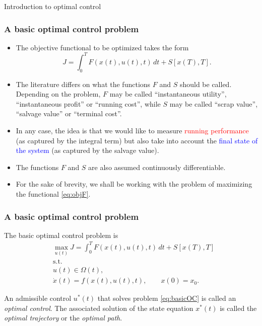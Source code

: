 \documentclass[10pt]{beamer}
\theoremstyle{definition}
\begin{document}
\begin{section}{Introduction to optimal control}
\begin{frame}[fragile]
\frametitle{A basic optimal control problem}
\begin{itemize}\itemsep1em
\item The objective functional to be optimized takes the form \begin{equation}
J = \int_{0}^{T}F(x(t),u(t),t)\,dt + S[x(T),T].
\label{eq:objF}
\end{equation}
\item The literature differs on what the functions $ F $ and $ S $ should be called. Depending on the problem, $ F $ may be called ``instantaneous utility'', ``instantaneous profit'' or ``running cost'', while $ S $ may be called ``scrap value'', ``salvage value'' or ``terminal cost''.
\item In any case, the idea is that we would like to measure \textcolor{red}{running performance} (as captured by the integral term) but also take into account the \textcolor{blue}{final state of the system} (as captured by the salvage value).
\item The functions $ F $ and $ S $ are also assumed continuously differentiable.
\item For the sake of brevity, we shall be working with the problem of maximizing the functional \eqref{eq:objF}.
\end{itemize}
\end{frame}

\begin{frame}[fragile]
\frametitle{A basic optimal control problem}
The basic optimal control problem is 
\begin{equation}
\begin{split}
& \max_{u(t)} J = \int_{0}^{T}F(x(t),u(t),t)\,dt + S[x(T),T] \\
&\text{s.t.}\\
& u(t)\in \Omega(t) ,\\
& \dot{x}(t)=f(x(t),u(t),t),\qquad x(0)=x_0.
\end{split}
\label{eq:basicOC}
\end{equation}\bigskip

An admissible control $ u^*(t) $ that solves problem \eqref{eq:basicOC} is called an \emph{optimal control}. The associated solution of the state equation $ x^*(t) $ is called the \emph{optimal trajectory} or the \emph{optimal path}.
\end{frame}


\end{section}
\end{document}
